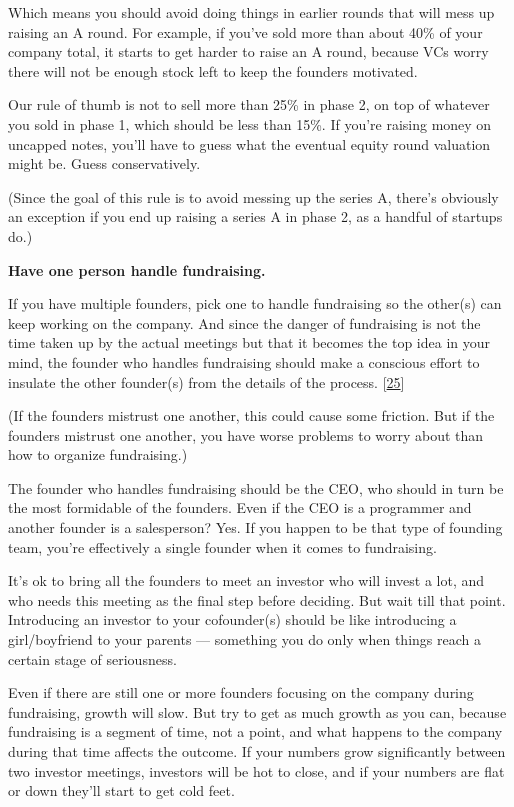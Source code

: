 Which means you should avoid doing things in earlier rounds that will
mess up raising an A round. For example, if you've sold more than about
40\% of your company total, it starts to get harder to raise an A round,
because VCs worry there will not be enough stock left to keep the
founders motivated.

Our rule of thumb is not to sell more than 25\% in phase 2, on top of
whatever you sold in phase 1, which should be less than 15\%. If you're
raising money on uncapped notes, you'll have to guess what the eventual
equity round valuation might be. Guess conservatively.

(Since the goal of this rule is to avoid messing up the series A,
there's obviously an exception if you end up raising a series A in phase
2, as a handful of startups do.)

\textbf{Have one person handle fundraising.}

If you have multiple founders, pick one to handle fundraising so the
other(s) can keep working on the company. And since the danger of
fundraising is not the time taken up by the actual meetings but that it
becomes the top idea in your mind, the founder who handles fundraising
should make a conscious effort to insulate the other founder(s) from the
details of the process. {[}\hyperref[f25n]{25}{]}

(If the founders mistrust one another, this could cause some friction.
But if the founders mistrust one another, you have worse problems to
worry about than how to organize fundraising.)

The founder who handles fundraising should be the CEO, who should in
turn be the most formidable of the founders. Even if the CEO is a
programmer and another founder is a salesperson? Yes. If you happen to
be that type of founding team, you're effectively a single founder when
it comes to fundraising.

It's ok to bring all the founders to meet an investor who will invest a
lot, and who needs this meeting as the final step before deciding. But
wait till that point. Introducing an investor to your cofounder(s)
should be like introducing a girl/boyfriend to your parents ---
something you do only when things reach a certain stage of seriousness.

Even if there are still one or more founders focusing on the company
during fundraising, growth will slow. But try to get as much growth as
you can, because fundraising is a segment of time, not a point, and what
happens to the company during that time affects the outcome. If your
numbers grow significantly between two investor meetings, investors will
be hot to close, and if your numbers are flat or down they'll start to
get cold feet.


